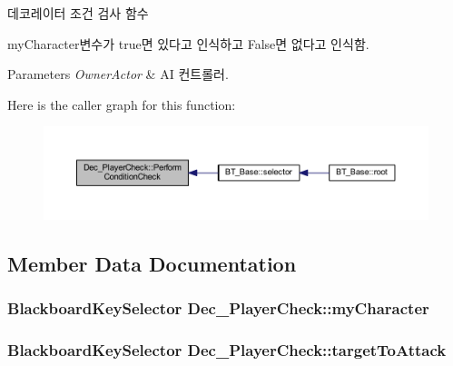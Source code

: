 데코레이터 조건 검사 함수 

my\+Character변수가 true면 있다고 인식하고 False면 없다고 인식함. 
\begin{DoxyParams}{Parameters}
{\em Owner\+Actor} & AI 컨트롤러. \\
\hline
\end{DoxyParams}


Here is the caller graph for this function\+:
\nopagebreak
\begin{figure}[H]
\begin{center}
\leavevmode
\includegraphics[width=350pt]{class_dec___player_check_a85ba59a2199c42630eb9da3fe398b877_icgraph}
\end{center}
\end{figure}




\subsection{Member Data Documentation}
\subsubsection[{\texorpdfstring{my\+Character}{myCharacter}}]{\setlength{\rightskip}{0pt plus 5cm}Blackboard\+Key\+Selector Dec\+\_\+\+Player\+Check\+::my\+Character}\hypertarget{class_dec___player_check_a3251552a2d0c5c80aa8dea038622f0cb}{}\label{class_dec___player_check_a3251552a2d0c5c80aa8dea038622f0cb}
\subsubsection[{\texorpdfstring{target\+To\+Attack}{targetToAttack}}]{\setlength{\rightskip}{0pt plus 5cm}Blackboard\+Key\+Selector Dec\+\_\+\+Player\+Check\+::target\+To\+Attack}\hypertarget{class_dec___player_check_ad28098e77833bb97a082bb3c7e79c5f4}{}\label{class_dec___player_check_ad28098e77833bb97a082bb3c7e79c5f4}
